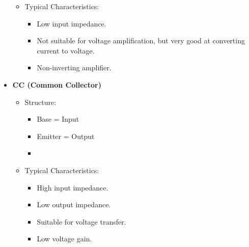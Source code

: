 \begin{multicols}{2}
\begin{CheatsheetEntryFrame}
\begin{itemize}
\begin{itemize}
\begin{itemize}
                \end{itemize}
                \item Typical Characteristics:
                \begin{itemize}
                    \item Low input impedance.
                    \item Not suitable for voltage amplification, but very good at converting current to voltage.
                    \item Non-inverting amplifier.
                \end{itemize}
            \end{itemize}
            \item \textbf{CC (Common Collector)}
            \begin{itemize}
                \item Structure:
                \begin{itemize}
                    \item Base = Input
                    \item Emitter = Output
                    \item {}
                \end{itemize}
                \item Typical Characteristics:
                \begin{itemize}
                    \item High input impedance.
                    \item Low output impedance.
                    \item Suitable for voltage transfer.
                    \item Low voltage gain.
                \end{itemize}
            \end{itemize}
        \end{itemize}


    \end{CheatsheetEntryFrame}

    \begin{CheatsheetEntryFrame}



\end{CheatsheetEntryFrame}
\end{multicols}
